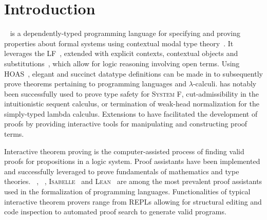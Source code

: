 \chapter{Introduction}\label{chapter:introduction}






\Beluga~\cite{pientka2010beluga} is a dependently-typed programming language for specifying and proving properties about formal systems using contextual modal type theory~\cite{nanevski2008contextual}.
It leverages the \acf{LF}~\cite{harper1993framework}, extended with explicit contexts, contextual objects and substitutions~\cite{DBLP:journals/corr/abs-1009-2789, cave2013first}, which allow for logic reasoning involving open terms.
Using \ac{HOAS}~\cite{pfenning1988higher}, elegant and succinct datatype definitions can be made in \LF to subsequently prove theorems pertaining to programming languages and $ \lambda $-calculi.
\Beluga has notably been successfully used to prove type safety for \textsc{System F}, cut-admissibility in the intuitionistic sequent calculus, or termination of weak-head normalization for the simply-typed lambda calculus.
Extensions to \Beluga have facilitated the development of proofs by providing interactive tools for manipulating and constructing proof terms.



Interactive theorem proving is the computer-assisted process of finding valid proofs for propositions in a logic system.
Proof assistants have been implemented and successfully leveraged to prove fundamentals of mathematics and type theories.
\Agda~\cite{clffolp}, \Coq~\cite{Coq, bertot2013interactive}, \textsc{Isabelle}~\cite{nipkow2002isabelle} and \textsc{Lean}~\cite{lean4} are among the most prevalent proof assistants used in the formalization of programming languages.
Functionalities of typical interactive theorem provers range from \acp{REPL} allowing for structural editing and code inspection to automated proof search to generate valid programs.

